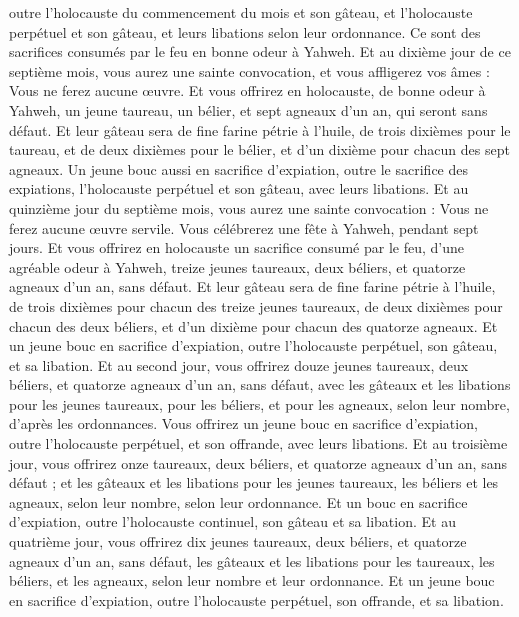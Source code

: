 \begin{multicols}{2}
outre l'holocauste du commencement du mois et son gâteau, et l'holocauste perpétuel et son gâteau, et leurs libations selon leur ordonnance. Ce sont des sacrifices consumés par le feu en bonne odeur à Yahweh.
Et au dixième jour de ce septième mois, vous aurez une sainte convocation, et vous affligerez vos âmes : Vous ne ferez aucune œuvre.
Et vous offrirez en holocauste, de bonne odeur à Yahweh, un jeune taureau, un bélier, et sept agneaux d'un an, qui seront sans défaut.
Et leur gâteau sera de fine farine pétrie à l'huile, de trois dixièmes pour le taureau, et de deux dixièmes pour le bélier,
et d'un dixième pour chacun des sept agneaux.
Un jeune bouc aussi en sacrifice d'expiation, outre le sacrifice des expiations, l'holocauste perpétuel et son gâteau, avec leurs libations.
Et au quinzième jour du septième mois, vous aurez une sainte convocation : Vous ne ferez aucune œuvre servile. Vous célébrerez une fête à Yahweh, pendant sept jours.
Et vous offrirez en holocauste un sacrifice consumé par le feu, d'une agréable odeur à Yahweh, treize jeunes taureaux, deux béliers, et quatorze agneaux d'un an, sans défaut.
Et leur gâteau sera de fine farine pétrie à l'huile, de trois dixièmes pour chacun des treize jeunes taureaux, de deux dixièmes pour chacun des deux béliers,
et d'un dixième pour chacun des quatorze agneaux.
Et un jeune bouc en sacrifice d'expiation, outre l'holocauste perpétuel, son gâteau, et sa libation.
Et au second jour, vous offrirez douze jeunes taureaux, deux béliers, et quatorze agneaux d'un an, sans défaut,
avec les gâteaux et les libations pour les jeunes taureaux, pour les béliers, et pour les agneaux, selon leur nombre, d'après les ordonnances.
Vous offrirez un jeune bouc en sacrifice d'expiation, outre l'holocauste perpétuel, et son offrande, avec leurs libations.
Et au troisième jour, vous offrirez onze taureaux, deux béliers, et quatorze agneaux d'un an, sans défaut ;
et les gâteaux et les libations pour les jeunes taureaux, les béliers et les agneaux, selon leur nombre, selon leur ordonnance.
Et un bouc en sacrifice d'expiation, outre l'holocauste continuel, son gâteau et sa libation.
Et au quatrième jour, vous offrirez dix jeunes taureaux, deux béliers, et quatorze agneaux d'un an, sans défaut,
les gâteaux et les libations pour les taureaux, les béliers, et les agneaux, selon leur nombre et leur ordonnance.
Et un jeune bouc en sacrifice d'expiation, outre l'holocauste perpétuel, son offrande, et sa libation.

\end{multicols}
